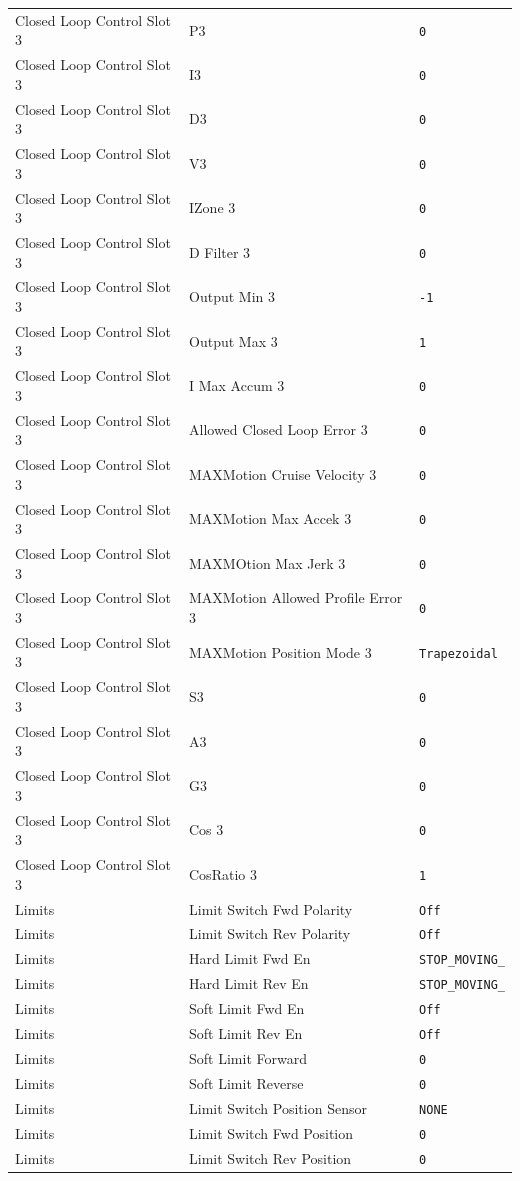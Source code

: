 \begin{longtable}{p{3.5cm} p{8cm} p{3cm}}
Closed Loop Control Slot 3 & P3 & \texttt{0} \\
Closed Loop Control Slot 3 & I3 & \texttt{0} \\
Closed Loop Control Slot 3 & D3 & \texttt{0} \\
Closed Loop Control Slot 3 & V3 & \texttt{0} \\
Closed Loop Control Slot 3 & IZone 3 & \texttt{0} \\
Closed Loop Control Slot 3 & D Filter 3 & \texttt{0} \\
Closed Loop Control Slot 3 & Output Min 3 & \texttt{-1} \\
Closed Loop Control Slot 3 & Output Max 3 & \texttt{1} \\
Closed Loop Control Slot 3 & I Max Accum 3 & \texttt{0} \\
Closed Loop Control Slot 3 & Allowed Closed Loop Error 3 & \texttt{0} \\
Closed Loop Control Slot 3 & MAXMotion Cruise Velocity 3 & \texttt{0} \\
Closed Loop Control Slot 3 & MAXMotion Max Accek 3 & \texttt{0} \\
Closed Loop Control Slot 3 & MAXMOtion Max Jerk 3 & \texttt{0} \\
Closed Loop Control Slot 3 & MAXMotion Allowed Profile Error 3 & \texttt{0} \\
Closed Loop Control Slot 3 & MAXMotion Position Mode 3 & \texttt{Trapezoidal} \\
Closed Loop Control Slot 3 & S3 & \texttt{0} \\
Closed Loop Control Slot 3 & A3 & \texttt{0} \\
Closed Loop Control Slot 3 & G3 & \texttt{0} \\
Closed Loop Control Slot 3 & Cos 3 & \texttt{0} \\
Closed Loop Control Slot 3 & CosRatio 3 & \texttt{1} \\

Limits & Limit Switch Fwd Polarity & \texttt{Off} \\
Limits & Limit Switch Rev Polarity & \texttt{Off} \\
Limits & Hard Limit Fwd En & \texttt{STOP\_MOVING\_} \\
Limits & Hard Limit Rev En & \texttt{STOP\_MOVING\_} \\
Limits & Soft Limit Fwd En & \texttt{Off} \\
Limits & Soft Limit Rev En & \texttt{Off} \\
Limits & Soft Limit Forward & \texttt{0} \\
Limits & Soft Limit Reverse & \texttt{0} \\
Limits & Limit Switch Position Sensor & \texttt{NONE} \\
Limits & Limit Switch Fwd Position & \texttt{0} \\
Limits & Limit Switch Rev Position & \texttt{0} \\


\end{longtable}
